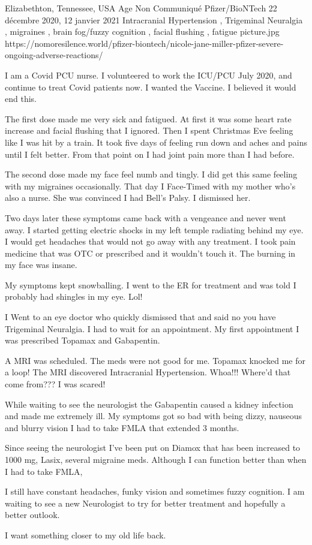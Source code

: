           {Elizabethton, Tennessee, USA}
          {Age Non Communiqué}
          {Pfizer/BioNTech}
          {22 décembre 2020, 12 janvier 2021}
          {
            Intracranial Hypertension
            , Trigeminal Neuralgia
            , migraines
            , brain fog/fuzzy cognition
            , facial flushing
            , fatigue
          }
          {picture.jpg}
          {https://nomoresilence.world/pfizer-biontech/nicole-jane-miller-pfizer-severe-ongoing-adverse-reactions/}
          {

I am a Covid PCU nurse. I volunteered to work the ICU/PCU July 2020, and
continue to treat Covid patients now. I wanted the Vaccine. I believed it would
end this.

The first dose made me very sick and fatigued. At first it was some heart rate
increase and facial flushing that I ignored. Then I spent Christmas Eve feeling
like I was hit by a train. It took five days of feeling run down and aches and
pains until I felt better. From that point on I had joint pain more than I had
before.

The second dose made my face feel numb and tingly. I did get this same feeling
with my migraines occasionally. That day I Face-Timed with my mother who’s also
a nurse. She was convinced I had Bell’s Palsy. I dismissed her.

Two days later these symptoms came back with a vengeance and never went away. I
started getting electric shocks in my left temple radiating behind my eye. I
would get headaches that would not go away with any treatment. I took pain
medicine that was OTC or prescribed and it wouldn’t touch it. The burning in my
face was insane.

My symptoms kept snowballing. I went to the ER for treatment and was told I
probably had shingles in my eye. Lol!

I Went to an eye doctor who quickly dismissed that and said no you have
Trigeminal Neuralgia. I had to wait for an appointment. My first appointment I
was prescribed Topamax and Gabapentin.

A MRI was scheduled. The meds were not good for me. Topamax knocked me for a
loop! The MRI discovered Intracranial Hypertension. Whoa!!! Where’d that come
from??? I was scared!

While waiting to see the neurologist the Gabapentin caused a kidney infection
and made me extremely ill. My symptoms got so bad with being dizzy, nauseous and
blurry vision I had to take FMLA that extended 3 months.

Since seeing the neurologist I’ve been put on Diamox that has been increased to
1000 mg, Lasix, several migraine meds. Although I can function better than when
I had to take FMLA,

I still have constant headaches, funky vision and sometimes fuzzy cognition. I
am waiting to see a new Neurologist to try for better treatment and hopefully a
better outlook.

I want something closer to my old life back.

}
